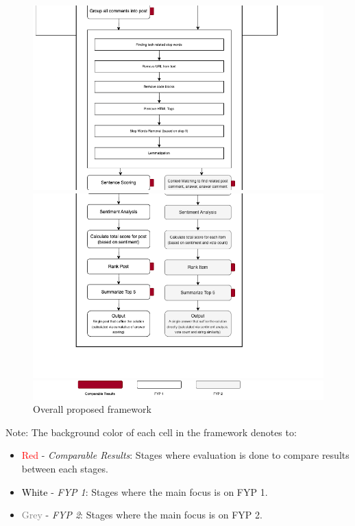 \begin{figure}[H]
  \centerline{\includegraphics[scale=0.5]{slice_framework_3.png}}
  \centerline{\includegraphics[scale=0.5]{slice_framework_4.png}}
  \centerline{\includegraphics[scale=0.5]{slice_framework_5.png}}
  \caption{Overall proposed framework}
  \label{framework}
\end{figure} 

\noindent  Note: The background color of each cell in the framework denotes to:
\begin{itemize}
  \item \textcolor{red}{Red} - \emph{Comparable Results}: Stages where evaluation is done to compare results between each stages.
  \item \textcolor{black}{White} - \emph{FYP 1}: Stages where the main focus is on FYP 1.
  \item \textcolor{gray}{Grey} - \emph{FYP 2}: Stages where the main focus is on FYP 2.
\end{itemize}

